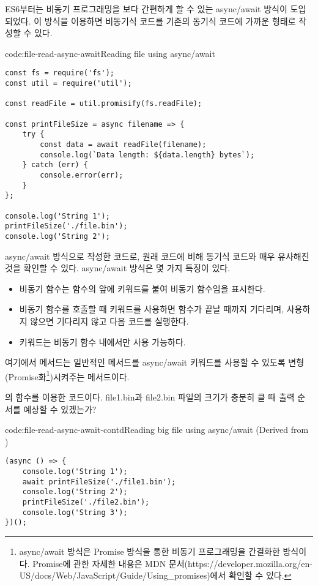 ES6부터는 비동기 프로그래밍을 보다 간편하게 할 수 있는 async/await 방식이 도입되었다. 이 방식을 이용하면 비동기식 코드를 기존의 동기식 코드에 가까운 형태로 작성할 수 있다.

\begin{code}{code:file-read-async-await}{Reading file using async/await}
\begin{verbatim}
const fs = require('fs');
const util = require('util');

const readFile = util.promisify(fs.readFile);

const printFileSize = async filename => {
    try {
        const data = await readFile(filename);
        console.log(`Data length: ${data.length} bytes`);
    } catch (err) {
        console.error(err);
    }
};

console.log('String 1');
printFileSize('./file.bin');
console.log('String 2');
\end{verbatim}
\end{code}

\은 \를 async/await 방식으로 작성한 코드로, 원래 코드에 비해 동기식 코드와 매우 유사해진 것을 확인할 수 있다. async/await 방식은 몇 가지 특징이 있다.

\begin{itemize}
    \item 비동기 함수는 함수의 앞에  키워드를 붙여 비동기 함수임을 표시한다.
    \item 비동기 함수를 호출할 때  키워드를 사용하면 함수가 끝날 때까지 기다리며, 사용하지 않으면 기다리지 않고 다음 코드를 실행한다.
    \item {} 키워드는 비동기 함수 내에서만 사용 가능하다.
\end{itemize}

여기에서  메서드는 일반적인 메서드를 async/await 키워드를 사용할 수 있도록 변형(Promise화\footnote{async/await 방식은 Promise 방식을 통한 비동기 프로그래밍을 간결화한 방식이다. Promise에 관한 자세한 내용은 MDN 문서(https://developer.mozilla.org/en-US/docs/Web/JavaScript/Guide/Using\_promises)에서 확인할 수 있다.})시켜주는 메서드이다.

\는 의  함수를 이용한 코드이다. file1.bin과 file2.bin 파일의 크기가 충분히 클 때 출력 순서를 예상할 수 있겠는가?

\begin{code}{code:file-read-async-await-contd}{Reading big file using async/await (Derived from )}
\begin{verbatim}
(async () => {
    console.log('String 1');
    await printFileSize('./file1.bin');
    console.log('String 2');
    printFileSize('./file2.bin');
    console.log('String 3');
})();
\end{verbatim}
\end{code}

